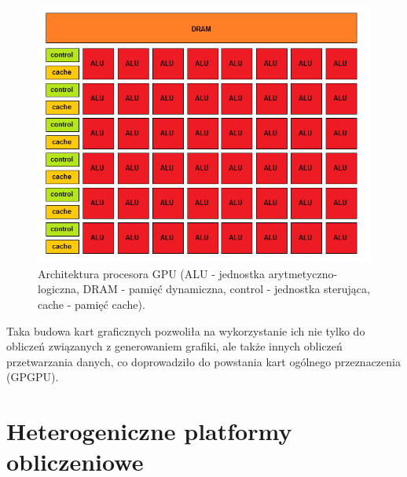 \begin{figure}[H]
        \centering
                \centering
                \includegraphics[width=12cm]{rys7}
	\caption{Architektura procesora GPU (ALU - jednostka arytmetyczno-logiczna, DRAM - pamięć dynamiczna, control - jednostka sterująca, cache - pamięć cache).}
\end{figure}
Taka budowa kart graficznych pozwoliła na wykorzystanie ich nie tylko do obliczeń związanych z generowaniem grafiki, ale także innych obliczeń przetwarzania danych, co doprowadziło do powstania kart ogólnego przeznaczenia (GPGPU).




\section{Heterogeniczne platformy obliczeniowe}\label{sec:hetero}

